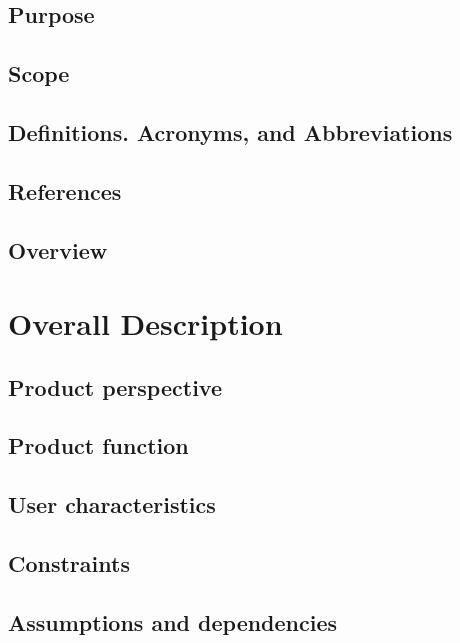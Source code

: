 \documentclass[12pt]{article}
\begin{document}
\subsection{Purpose}
\subsection{Scope}
\subsection{Definitions. Acronyms, and Abbreviations}
\subsection{References}
\subsection{Overview}

\section{Overall Description}
\subsection{Product perspective}
\subsection{Product function}
\subsection{User characteristics}
\subsection{Constraints}
\subsection{Assumptions and dependencies}

\newpage
\normalsize
\end{document}
